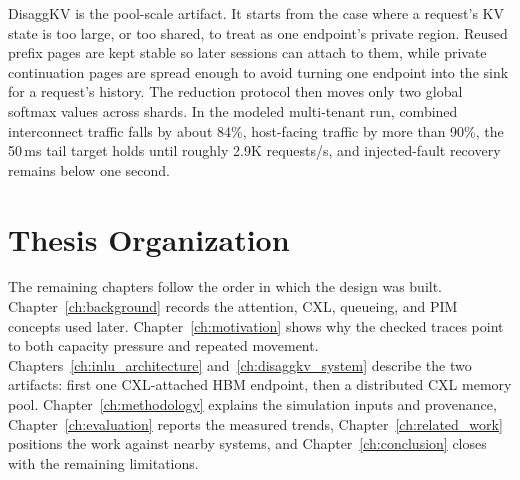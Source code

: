 DisaggKV is the pool-scale artifact. It starts from the case where a request's KV state is too large, or too shared, to treat as one endpoint's private region. Reused prefix pages are kept stable so later sessions can attach to them, while private continuation pages are spread enough to avoid turning one endpoint into the sink for a request's history. The reduction protocol then moves only two global softmax values across shards. In the modeled multi-tenant run, combined interconnect traffic falls by about 84\%, host-facing traffic by more than 90\%, the 50\,ms tail target holds until roughly 2.9K requests/s, and injected-fault recovery remains below one second.

\section{Thesis Organization}
The remaining chapters follow the order in which the design was built. Chapter~\ref{ch:background} records the attention, CXL, queueing, and PIM concepts used later. Chapter~\ref{ch:motivation} shows why the checked traces point to both capacity pressure and repeated movement. Chapters~\ref{ch:inlu_architecture} and~\ref{ch:disaggkv_system} describe the two artifacts: first one CXL-attached HBM endpoint, then a distributed CXL memory pool. Chapter~\ref{ch:methodology} explains the simulation inputs and provenance, Chapter~\ref{ch:evaluation} reports the measured trends, Chapter~\ref{ch:related_work} positions the work against nearby systems, and Chapter~\ref{ch:conclusion} closes with the remaining limitations.
